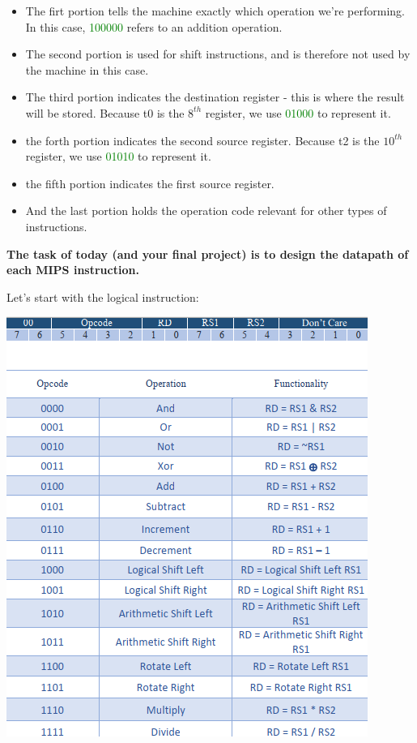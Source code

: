 \documentclass[11pt]{article}
\begin{document}
\begin{itemize}
    \item The firt portion tells the machine exactly which operation we’re performing. In this case, \textcolor{green}{100000} refers to an addition operation.
    \item The second portion is used for shift instructions, and is therefore not used by the machine in this case.
    \item The  third portion indicates the destination register - this is where the result will be stored. Because t0 is the $8^{th}$ register, we use \textcolor{green}{01000} to represent it. 
    \item the forth portion indicates the second source register. Because t2 is the $10^{th}$ register, we use \textcolor{green}{01010} to represent it.
    \item the fifth portion indicates the first source register.
    \item And the last portion holds the operation code relevant for other types of instructions. 
\end{itemize}


\bigskip

\textbf{The task of today (and your final project) is to design the datapath of each MIPS instruction.}

\bigskip


Let's start with the logical instruction: 


\begin{center}
\includegraphics[]{Logical.png}    
\end{center}
\end{document}
